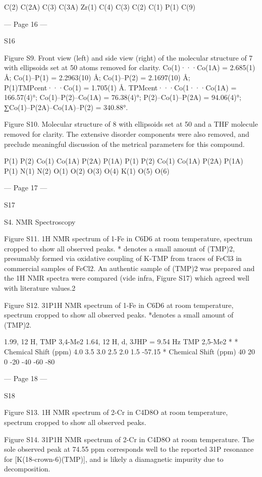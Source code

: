  
C(2)
C(2A)
C(3)
C(3A)
Zr(1)
C(4)
C(3)
C(2)
C(1)
P(1)
C(9)


--- Page 16 ---
 
 
S16 
 
 
 
Figure S9. Front view (left) and side view (right) of the molecular structure of 7 with ellipsoids set at 50%
atoms removed for clarity. 
Co(1)···Co(1A) = 2.685(1) Å; Co(1)–P(1) = 2.2963(10) Å; Co(1)–P(2) = 2.1697(10) Å; P(1)TMPcent···Co(1) = 1.705(1) Å.  
TPMcent···Co(1···Co(1A) = 166.57(4)°; Co(1)–P(2)–Co(1A) = 76.38(4)°; P(2)–Co(1)–P(2A) = 94.06(4)°; ∑Co(1)–P(2A)–Co(1A)–P(2) 
= 340.88°. 
 
 
Figure S10. Molecular structure of 8 with ellipsoids set at 50%
and a THF molecule removed for clarity. The extensive disorder components were also removed, and preclude meaningful 
discussion of the metrical parameters for this compound. 
 
 
P(1)
P(2)
Co(1)
Co(1A)
P(2A)
P(1A)
P(1)
P(2)
Co(1)
Co(1A)
P(2A)
P(1A)
P(1)
N(1)
N(2)
O(1)
O(2)
O(3)
O(4)
K(1)
O(5)
O(6)


--- Page 17 ---
 
 
S17 
 
 
S4. NMR Spectroscopy 
 
Figure S11. 1H NMR spectrum of 1-Fe in C6D6 at room temperature, spectrum cropped to show all observed peaks. * denotes 
a small amount of (TMP)2, presumably formed via oxidative coupling of K-TMP from traces of FeCl3 in commercial samples 
of FeCl2. An authentic sample of (TMP)2 was prepared and the 1H NMR spectra were compared (vide infra, Figure S17) which 
agreed well with literature values.2  
 
 
Figure S12. 31P{1H} NMR spectrum of 1-Fe in C6D6 at room temperature, spectrum cropped to show all observed peaks. 
*denotes a small amount of (TMP)2. 
 
 
1.99, 12 H,
TMP 3,4-Me2
1.64, 12 H, 
d, 3JHP = 9.54 Hz
TMP 2,5-Me2
*
*
Chemical Shift (ppm)
4.0
3.5
3.0
2.5
2.0
1.5
-57.15
*
Chemical Shift (ppm)
40
20
0
-20
-40
-60
-80


--- Page 18 ---
 
 
S18 
 
 
 
Figure S13. 1H NMR spectrum of 2-Cr in C4D8O at room temperature, spectrum cropped to show all observed peaks. 
 
 
Figure S14. 31P{1H} NMR spectrum of 2-Cr in C4D8O at room temperature. The sole observed peak at 74.55 ppm corresponds 
well to the reported 31P resonance for [K(18-crown-6)(TMP)], and is likely a diamagnetic impurity due to decomposition. 
 
